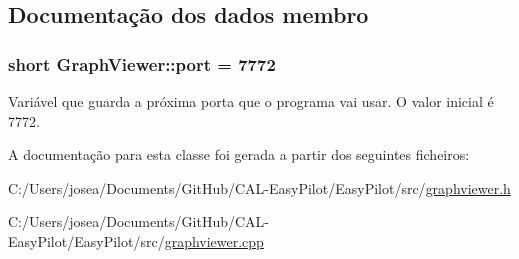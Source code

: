 \subsection{Documentação dos dados membro}
\hypertarget{class_graph_viewer_a89d0abe75f41feededc49497cc514342}{}
\subsubsection[{port}]{\setlength{\rightskip}{0pt plus 5cm}short Graph\+Viewer\+::port = 7772\hspace{0.3cm}{\ttfamily [static]}}\label{class_graph_viewer_a89d0abe75f41feededc49497cc514342}
Variável que guarda a próxima porta que o programa vai usar. O valor inicial é 7772. 

A documentação para esta classe foi gerada a partir dos seguintes ficheiros\+:\begin{DoxyCompactItemize}
\item 
C\+:/\+Users/josea/\+Documents/\+Git\+Hub/\+C\+A\+L-\/\+Easy\+Pilot/\+Easy\+Pilot/src/\hyperlink{graphviewer_8h}{graphviewer.\+h}\item 
C\+:/\+Users/josea/\+Documents/\+Git\+Hub/\+C\+A\+L-\/\+Easy\+Pilot/\+Easy\+Pilot/src/\hyperlink{graphviewer_8cpp}{graphviewer.\+cpp}\end{DoxyCompactItemize}
